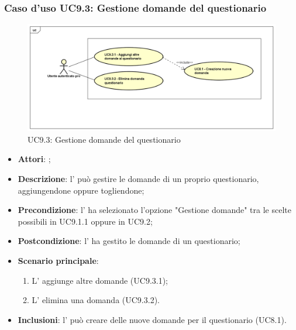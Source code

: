 	 \subsubsection{Caso d'uso UC9.3: Gestione domande del questionario}
	 \label{UC9.3}
	 \begin{figure}[h]
	 	\centering
	 	\includegraphics[scale=0.5,keepaspectratio]{UML/UC9_3.png}
	 	\caption{UC9.3: Gestione domande del questionario}
	 \end{figure}
	 \FloatBarrier
	 \begin{itemize}
	 	\item \textbf{Attori}: \uaupro{};
	 	\item \textbf{Descrizione}: l'\uaupro{} può gestire le domande di un proprio questionario, aggiungendone oppure togliendone;
	 	\item \textbf{Precondizione}: l'\uaupro{} ha selezionato l'opzione "Gestione domande" tra le scelte possibili in UC9.1.1 oppure in UC9.2;
	 	\item \textbf{Postcondizione}: l'\uaupro{} ha gestito le domande di un questionario;
	 	\item \textbf{Scenario principale}: 
	 	\begin{enumerate}
	 		\item L'\uaupro{} aggiunge altre domande (UC9.3.1);
	 		\item L'\uaupro{} elimina una domanda (UC9.3.2).
	 	\end{enumerate}
	 	\item \textbf{Inclusioni}: l'\uaupro{} può creare delle nuove domande per il questionario (UC8.1).		
	 \end{itemize}
	 
